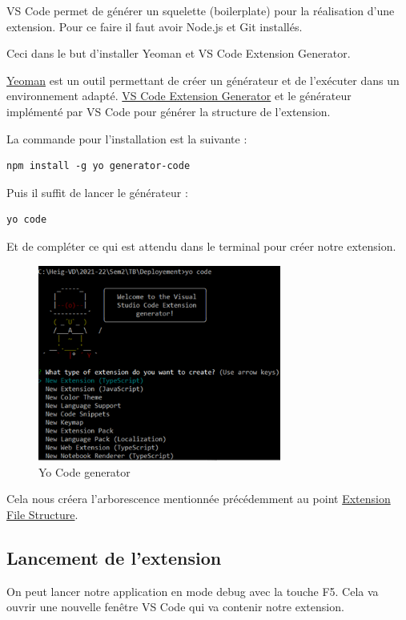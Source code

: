 \documentclass[
    iict, %
    il, %
]{heig-tb}
\begin{document}
VS Code permet de générer un squelette (boilerplate) pour la réalisation d'une extension.
Pour ce faire il faut avoir Node.js et Git installés.

Ceci dans le but d'installer Yeoman et VS Code Extension Generator.

\href{https://yeoman.io/}{Yeoman} est un outil permettant de créer un générateur et de l'exécuter dans un environnement adapté.
\href{https://www.npmjs.com/package/generator-code}{VS Code Extension Generator} et le générateur implémenté par VS Code pour générer la structure de l'extension.

La commande pour l'installation est la suivante :

\begin{lstlisting}[frame=single,caption={generator-code},label={generator-code}]
npm install -g yo generator-code
\end{lstlisting}

Puis il suffit de lancer le générateur :

\begin{lstlisting}[frame=single]
yo code
\end{lstlisting}

Et de compléter ce qui est attendu dans le terminal pour créer notre extension.

\begin{figure}[!h]
    \begin{center}
        \includegraphics[width=8cm]{assets/figures/yo-code.png}
    \end{center}
    \caption[Yo Code generator]{\label{yo-code}Yo Code generator}
\end{figure}

Cela nous créera l'arborescence mentionnée précédemment au point \hyperref[Extension File Structure]{Extension File Structure}.

\subsection{Lancement de l'extension}
On peut lancer notre application en mode debug avec la touche F5. Cela va ouvrir une nouvelle fenêtre VS Code qui va contenir notre extension.
\end{document}
